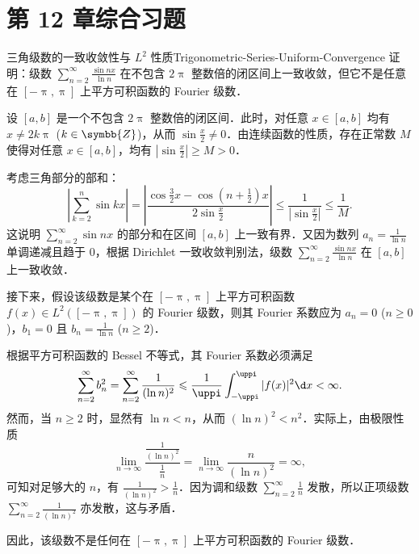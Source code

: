 \section{第 12 章综合习题}

\begin{problem}{三角级数的一致收敛性与 $L^2$ 性质}{Trigonometric-Series-Uniform-Convergence}
    证明：级数 $\sum_{n=2}^{\infty} \frac{\sin nx}{\ln n}$ 在不包含 $2\uppi$ 整数倍的闭区间上一致收敛，但它不是任意在 $[-\uppi, \uppi]$ 上平方可积函数的 Fourier 级数．
\end{problem}

\begin{myproof}
    设 $[a, b]$ 是一个不包含 $2\uppi$ 整数倍的闭区间．此时，对任意 $x \in [a, b]$ 均有 $x \neq 2k\uppi$ ($k \in \symbb{Z}$)，从而 $\sin\frac{x}{2} \neq 0$．由连续函数的性质，存在正常数 $M$ 使得对任意 $x \in [a, b]$，均有 $\left|\sin\frac{x}{2}\right| \geqslant M > 0$．

    考虑三角部分的部和：
    \begin{equation}\label{eq:trig-bound}
        \left| \sum_{k=2}^{n} \sin kx \right| = \left| \frac{\cos\frac{3}{2}x - \cos\left(n+\frac{1}{2}\right)x}{2\sin\frac{x}{2}} \right| \leqslant \frac{1}{\left|\sin\frac{x}{2}\right|} \leqslant \frac{1}{M}.
    \end{equation}
    这说明 $\sum_{n=2}^{\infty} \sin nx$ 的部分和在区间 $[a, b]$ 上一致有界．又因为数列 $a_n = \frac{1}{\ln n}$ 单调递减且趋于 $0$，根据 Dirichlet 一致收敛判别法，级数 $\sum_{n=2}^{\infty} \frac{\sin nx}{\ln n}$ 在 $[a, b]$ 上一致收敛．

    接下来，假设该级数是某个在 $[-\uppi, \uppi]$ 上平方可积函数 $f(x) \in L^2([-\uppi, \uppi])$ 的 Fourier 级数，则其 Fourier 系数应为 $a_n = 0$ ($n \geqslant 0$)，$b_1 = 0$ 且 $b_n = \frac{1}{\ln n}$ ($n \geqslant 2$)．

    根据平方可积函数的 Bessel 不等式，其 Fourier 系数必须满足
    \begin{equation}\label{eq:bessel-ineq-proof}
        \sum_{n=2}^{\infty} b_n^2 = \sum_{n=2}^{\infty} \frac{1}{(\ln n)^2} \leqslant \frac{1}{\uppi} \int_{-\uppi}^{\uppi} |f(x)|^2 \d x < \infty.
    \end{equation}
    然而，当 $n \geqslant 2$ 时，显然有 $\ln n < n$，从而 $(\ln n)^2 < n^2$．实际上，由极限性质
    \begin{equation}\label{eq:limit-comp}
        \lim_{n \to \infty} \frac{\frac{1}{(\ln n)^2}}{\frac{1}{n}} = \lim_{n \to \infty} \frac{n}{(\ln n)^2} = \infty,
    \end{equation}
    可知对足够大的 $n$，有 $\frac{1}{(\ln n)^2} > \frac{1}{n}$．因为调和级数 $\sum_{n=2}^{\infty} \frac{1}{n}$ 发散，所以正项级数 $\sum_{n=2}^{\infty} \frac{1}{(\ln n)^2}$ 亦发散，这与矛盾．

    因此，该级数不是任何在 $[-\uppi, \uppi]$ 上平方可积函数的 Fourier 级数．
\end{myproof}


